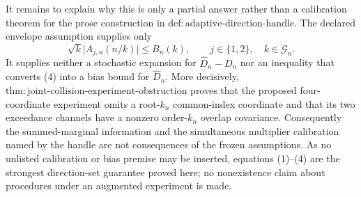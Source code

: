It remains to explain why this is only a partial answer rather than a calibration theorem for the prose construction in \(\mathrm{def{:}adaptive\text{-}direction\text{-}handle}\).  The declared envelope assumption supplies only
\[
 \sqrt{k}\lvert A_{j,n}(n/k)\rvert\leq B_n(k),
 \qquad j\in\{1,2\},\quad k\in\mathcal G_n. \tag{4}
\]
It supplies neither a stochastic expansion for \(\widehat D_n-D_n\) nor an inequality that converts (4) into a bias bound for \(\widehat D_n\).  More decisively, \(\mathrm{thm{:}joint\text{-}collision\text{-}experiment\text{-}obstruction}\) proves that the proposed four-coordinate experiment omits a root-\(k_n\) common-index coordinate and that its two exceedance channels have a nonzero order-\(k_n\) overlap covariance.  Consequently the summed-marginal information and the simultaneous multiplier calibration named by the handle are not consequences of the frozen assumptions.  As no unlisted calibration or bias premise may be inserted, equations (1)--(4) are the strongest direction-set guarantee proved here; no nonexistence claim about procedures under an augmented experiment is made.